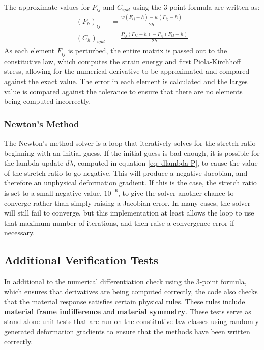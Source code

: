 \documentclass[]{spie}  %
\begin{document}
The approximate values for $P_{ij}$ and $C_{ijkl}$ using the 3-point formula are written as:
\begin{align}
(P_h)_{ij} &= \frac{w(F_{ij} + h) - w(F_{ij} - h)}{2h} \\[1ex]
(C_h)_{ijkl} &= \frac{P_{ij}(F_{kl} + h) - P_{ij}(F_{kl} - h)}{2h}
\end{align}
As each element $F_{ij}$ is perturbed, the entire matrix is passed out to the constitutive law, which computes the strain energy and first Piola-Kirchhoff stress, allowing for the numerical derivative to be approximated and compared against the exact value. The error in each element is calculated and the larges value is compared against the tolerance to ensure that there are no elements being computed incorrectly. 

\subsubsection{Newton's Method}
The Newton's method solver is a loop that iteratively solves for the stretch ratio beginning with an initial guess. If the initial guess is bad enough, it is possible for the lambda update $d\lambda$, computed in equation \ref{eq: dlambda P}, to cause the value of the stretch ratio to go negative. This will produce a negative Jacobian, and therefore an unphysical deformation gradient. If this is the case, the stretch ratio is set to a small negative value, $10^{-6}$, to give the solver another chance to converge rather than simply raising a Jacobian error. In many cases, the solver will still fail to converge, but this implementation at least allows the loop to use that maximum number of iterations, and then raise a convergence error if necessary. 

\subsection{Additional Verification Tests}
\label{sec: verification tests}
In additional to the numerical differentiation check using the 3-point formula, which ensures that derivatives are being computed correctly, the code also checks that the material response satisfies certain physical rules. These rules include \textbf{material frame indifference} and \textbf{material symmetry}. These tests serve as stand-alone unit tests that are run on the constitutive law classes using randomly generated deformation gradients to ensure that the methods have been written correctly. 
\end{document}
